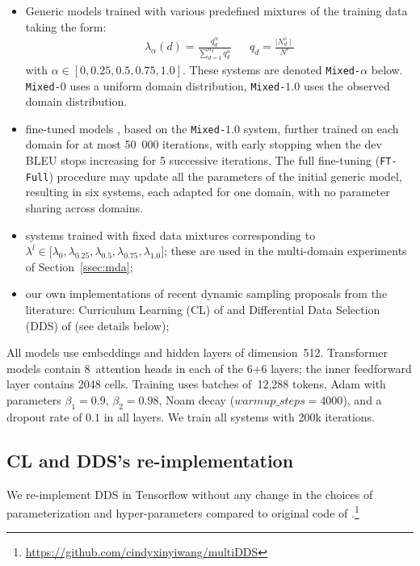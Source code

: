 \documentclass[11pt]{article}
\newcommand{\fyDone}[1]{\done[FY]\Todo[FY:]{\textcolor{orange}{#1}}}
\newcommand{\system}[1]{\texttt{{#1}}}
\begin{document}
\begin{itemize}
\itemsep0em 
\item Generic models trained with various predefined mixtures of the training data taking the form:
\begin{align} \label{mixture:trn}
\lambda_{\alpha}(d) = \frac{q_d^{\alpha}}{\displaystyle{\mathop{\sum}_{d=1}^{n_d}q_d^{\alpha}}} &&
q_d = \frac{\mid N^{s}_d \mid}{\displaystyle{N^{s}}} %
\end{align} \setlength{\abovedisplayskip}{2pt}
\setlength{\belowdisplayskip}{2pt} 
with $\alpha \in [0,0.25,0.5,0.75,1.0]$. These systems are denoted \system{Mixed-$\alpha$} below. \system{Mixed-$0$} uses a uniform domain distribution, \system{Mixed-$1.0$} uses the observed domain distribution.
\item fine-tuned models \citep{Luong15stanford,Freitag16fast}, based on the \system{Mixed-$1.0$} system, further trained on each domain for at most 50~000 iterations, with early stopping when the dev BLEU stops increasing for 5 successive iterations.\fyDone{for ?? iterations} The full fine-tuning (\system{FT-Full}) procedure may update all the parameters of the initial generic model, resulting in six systems, each adapted for one domain, with no parameter sharing across domains.
\item systems trained with fixed data mixtures corresponding to $\lambda^l \in \big[ \lambda_0, \lambda_{0.25}, \lambda_{0.5}, \lambda_{0.75}, \lambda_{1.0}\big]$; these are used in the multi-domain experiments of Section~\ref{ssec:mda};
\item  our own implementations of recent dynamic sampling proposals from the literature: Curriculum Learning (CL) of \citet{Zhang19curriculum} and Differential Data Selection (DDS) of \citet{Wang20balancing} (see details below);
\end{itemize}

All models use embeddings and hidden layers of dimension~512. Transformer models contain 8~attention heads in each of the 6+6 layers; the inner feedforward layer contains 2048 cells. Training uses batches of~12,288 tokens, Adam with parameters $\beta_1=0.9$, $\beta_2= 0.98$, Noam decay ($warmup\_steps=4000$), and a dropout rate of $0.1$ in all layers. We train all systems with 200k iterations.

\subsection{CL and DDS's re-implementation}\fyDone{Right place for this ?}
We re-implement DDS in Tensorflow without any change in the choices of parameterization and hyper-parameters compared to original code of \citet{Wang20balancing}.\footnote{\url{https://github.com/cindyxinyiwang/multiDDS}}
\end{document}
